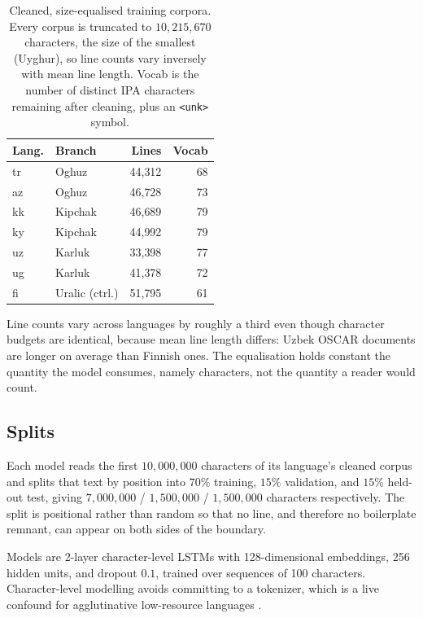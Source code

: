 \begin{table}[t]
\small
\centering
\begin{tabular}{@{}llrr@{}}
\toprule
Lang. & Branch & Lines & Vocab \\
\midrule
tr & Oghuz          & 44{,}312 & 68 \\
az & Oghuz          & 46{,}728 & 73 \\
kk & Kipchak        & 46{,}689 & 79 \\
ky & Kipchak        & 44{,}992 & 79 \\
uz & Karluk         & 33{,}398 & 77 \\
ug & Karluk         & 41{,}378 & 72 \\
fi & Uralic (ctrl.) & 51{,}795 & 61 \\
\bottomrule
\end{tabular}
\caption{Cleaned, size-equalised training corpora. Every corpus is truncated to $10{,}215{,}670$ characters, the size of the smallest (Uyghur), so line counts vary inversely with mean line length. Vocab is the number of distinct IPA characters remaining after cleaning, plus an \texttt{<unk>} symbol.}
\label{tab:corpora}
\end{table}

Line counts vary across languages by roughly a third even though character budgets are identical, because mean line length differs: Uzbek OSCAR documents are longer on average than Finnish ones. The equalisation holds constant the quantity the model consumes, namely characters, not the quantity a reader would count.

\subsection{Splits}
\label{sec:data-splits}

Each model reads the first $10{,}000{,}000$ characters of its language's cleaned corpus and splits that text by position into $70\%$ training, $15\%$ validation, and $15\%$ held-out test, giving $7{,}000{,}000$ / $1{,}500{,}000$ / $1{,}500{,}000$ characters respectively. The split is positional rather than random so that no line, and therefore no boilerplate remnant, can appear on both sides of the boundary.

Models are 2-layer character-level LSTMs \citep{hochreiter1997lstm} with 128-dimensional embeddings, 256 hidden units, and dropout $0.1$, trained over sequences of 100 characters. Character-level modelling avoids committing to a tokenizer, which is a live confound for agglutinative low-resource languages \citep{toraman2023impact}.

